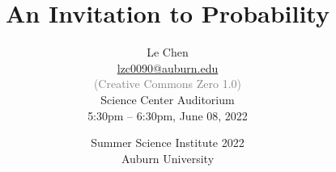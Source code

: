 


\title %
{
  An Invitation to Probability
}


\author{
  Le Chen\\
  {\small\url{lzc0090@auburn.edu}}\\[1em]
  \textcolor{gray}{\small (Creative Commons Zero 1.0)} \\[3em]
  {\small Science Center Auditorium}\\[1em]
  {\small 5:30pm -- 6:30pm, June 08, 2022}
}



\date[Auburn]{
  Summer Science Institute 2022\\
  Auburn University
}


